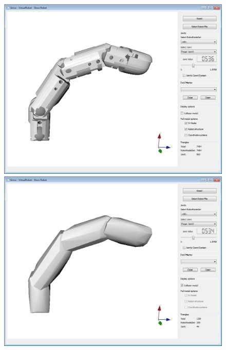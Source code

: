 \par
\begin{figure}[H]
	\centering
	\begin{minipage} {.45\linewidth}
	  \includegraphics[width=\linewidth]{Tutorial6a}
	\end{minipage}
	\begin{minipage} {.45\linewidth}
	  \includegraphics[width=\linewidth]{Tutorial6b}
	\end{minipage}
\end{figure}
\par
